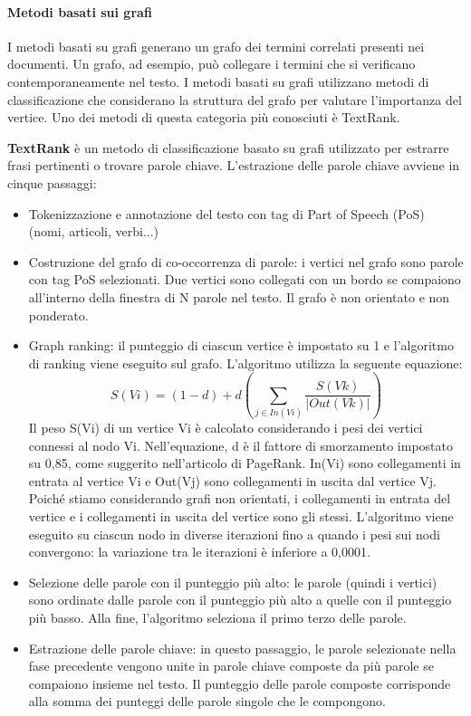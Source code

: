 \paragraph{Metodi basati sui grafi}
I metodi basati su grafi generano un grafo dei termini correlati presenti nei documenti. Un grafo, ad esempio, può collegare i termini che si verificano contemporaneamente nel testo. I metodi basati su grafi utilizzano metodi di classificazione che considerano la struttura del grafo per valutare l'importanza del vertice. Uno dei metodi di questa categoria più conosciuti è TextRank.

\textbf{TextRank} è un metodo di classificazione basato su grafi utilizzato per estrarre frasi pertinenti o trovare parole chiave. L'estrazione delle parole chiave avviene in cinque passaggi:

\begin{itemize}
\item Tokenizzazione e annotazione del testo con tag di Part of Speech (PoS) (nomi, articoli, verbi...)
\item Costruzione del grafo di co-occorrenza di parole: i vertici nel grafo sono parole con tag PoS selezionati. Due vertici sono collegati con un bordo se compaiono all'interno della finestra di N parole nel testo. Il grafo è non orientato e non ponderato.
\item Graph ranking: il punteggio di ciascun vertice è impostato su 1 e l'algoritmo di ranking viene eseguito sul grafo. L'algoritmo utilizza la seguente equazione:
\begin{equation}
S(Vi)=(1 - d) + d\left (\sum_{j \in In(Vi)} \frac{S(Vk)}{|Out(Vk)|}\right )
\end{equation}
Il peso S(Vi) di un vertice Vi è calcolato considerando i pesi dei vertici connessi al nodo Vi. Nell'equazione, d è il fattore di smorzamento impostato su 0,85, come suggerito nell'articolo di PageRank. In(Vi) sono collegamenti in entrata al vertice Vi e Out(Vj) sono collegamenti in uscita dal vertice Vj. Poiché stiamo considerando grafi non orientati, i collegamenti in entrata del vertice e i collegamenti in uscita del vertice sono gli stessi. L'algoritmo viene eseguito su ciascun nodo in diverse iterazioni fino a quando i pesi sui nodi convergono: la variazione tra le iterazioni è inferiore a 0,0001.
\item Selezione delle parole con il punteggio più alto: le parole (quindi i vertici) sono ordinate dalle parole con il punteggio più alto a quelle con il punteggio più basso. Alla fine, l'algoritmo seleziona il primo terzo delle parole.
\item Estrazione delle parole chiave: in questo passaggio, le parole selezionate nella fase precedente vengono unite in parole chiave composte da più parole se compaiono insieme nel testo. Il punteggio delle parole composte corrisponde alla somma dei punteggi delle parole singole che le compongono.
\end{itemize}

